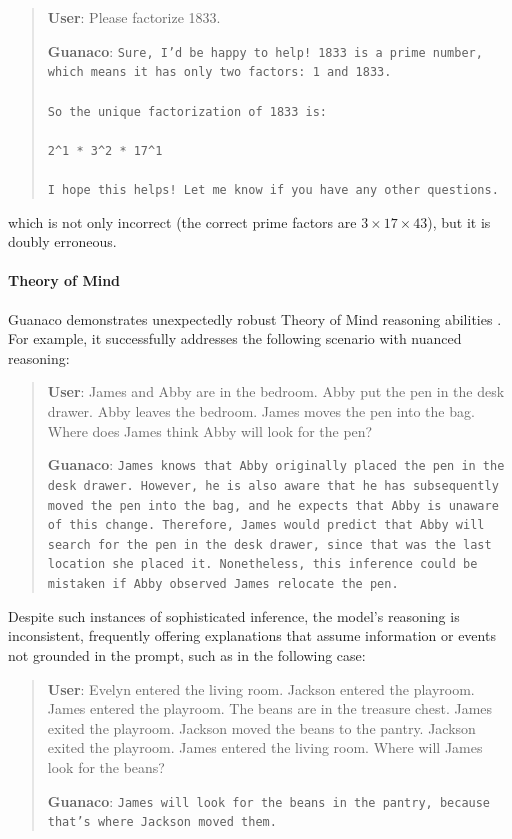 \begin{quote}
    \textbf{User}: Please factorize 1833.

    \textbf{Guanaco}: \texttt{Sure, I'd be happy to help! 1833 is a prime number, which means it has only two factors: 1 and 1833. \\ \\ So the unique factorization of 1833 is: \\ \\ 2\^{}1 * 3\^{}2 * 17\^{}1 \\ \\ I hope this helps! Let me know if you have any other questions.}
\end{quote}

which is not only incorrect (the correct prime factors are $3 \times 17 \times 43$), but it is doubly erroneous.

\paragraph{Theory of Mind} {Guanaco} demonstrates unexpectedly robust Theory of Mind reasoning abilities \cite{nematzadeh2018evaluating, sap2022neural}. For example, it successfully addresses the following scenario with nuanced reasoning:

\begin{quote}
    \textbf{User}: James and Abby are in the bedroom. Abby put the pen in the desk drawer. Abby leaves the bedroom. James moves the pen into the bag. Where does James think Abby will look for the pen?

    \textbf{Guanaco}: \texttt{James knows that Abby originally placed the pen in the desk drawer. However, he is also aware that he has subsequently moved the pen into the bag, and he expects that Abby is unaware of this change. Therefore, James would predict that Abby will search for the pen in the desk drawer, since that was the last location she placed it. Nonetheless, this inference could be mistaken if Abby observed James relocate the pen.}
\end{quote}

Despite such instances of sophisticated inference, the model’s reasoning is inconsistent, frequently offering explanations that assume information or events not grounded in the prompt, such as in the following case:

\begin{quote}
    \textbf{User}: Evelyn entered the living room. Jackson entered the playroom. James entered the playroom. The beans are in the treasure chest. James exited the playroom. Jackson moved the beans to the pantry. Jackson exited the playroom. James entered the living room. Where will James look for the beans?

    \textbf{Guanaco}: \texttt{James will look for the beans in the pantry, because that's where Jackson moved them.}
\end{quote}

